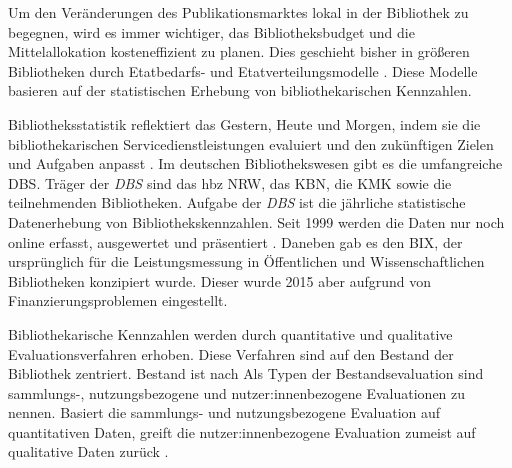 Um den Veränderungen des Publikationsmarktes lokal in der Bibliothek zu begegnen, wird es immer wichtiger, das Bibliotheksbudget und die Mittelallokation kosteneffizient zu planen. 
Dies geschieht bisher in größeren Bibliotheken durch Etatbedarfs- und Etatverteilungsmodelle \cite[vgl.][172 ff.]{moravetz-kuhlmann_monika_erwerbungspolitik_2015}.
Diese Modelle basieren auf der statistischen Erhebung von bibliothekarischen Kennzahlen.

Bibliotheksstatistik reflektiert das Gestern, Heute und Morgen, indem 
sie die bibliothekarischen Servicedienstleistungen evaluiert und den zukünftigen Zielen und Aufgaben anpasst \cites[vgl.][2 f.]{jilovsky_cathie_library_2004}[vgl.][462]{laitinen_markku_library_2013}.
Im deutschen Bibliothekswesen gibt es die umfangreiche \acrfull{DBS}. 
Träger der \textit{\acrshort{DBS}} sind das \acrfull{hbz NRW},  das \acrfull{KBN}, die \acrfull{KMK} sowie die teilnehmenden Bibliotheken.
Aufgabe der \textit{\acrshort{DBS}} ist die jährliche statistische Datenerhebung von Bibliothekskennzahlen. 
Seit 1999 werden die Daten nur noch online erfasst, ausgewertet und präsentiert \cite[vgl.][2]{schmidt_deutsche_2008}.
Daneben gab es den \acrfull{BIX}, der ursprünglich für die Leistungsmessung in Öffentlichen und Wissenschaftlichen Bibliotheken konzipiert wurde. 
Dieser wurde 2015 aber aufgrund von Finanzierungsproblemen eingestellt. 

Bibliothekarische Kennzahlen werden durch quantitative und qualitative Evaluationsverfahren erhoben. Diese Verfahren
sind auf den Bestand der Bibliothek zentriert. 
Bestand ist nach \citeauthor{johannsen_jochen_bestands-_2015}
 \cite[252]{johannsen_jochen_bestands-_2015}
Als Typen der Bestandsevaluation sind sammlungs-, nutzungsbezogene und nutzer:innenbezogene Evaluationen zu nennen\cite[vgl.][302]{johnson_peggy_fundamentals_2014}.
Basiert die sammlungs- und nutzungsbezogene Evaluation auf quantitativen Daten, greift die nutzer:innenbezogene Evaluation zumeist auf qualitative Daten zurück \cite[vgl.][461 ff.]{blake_data_2004}.

